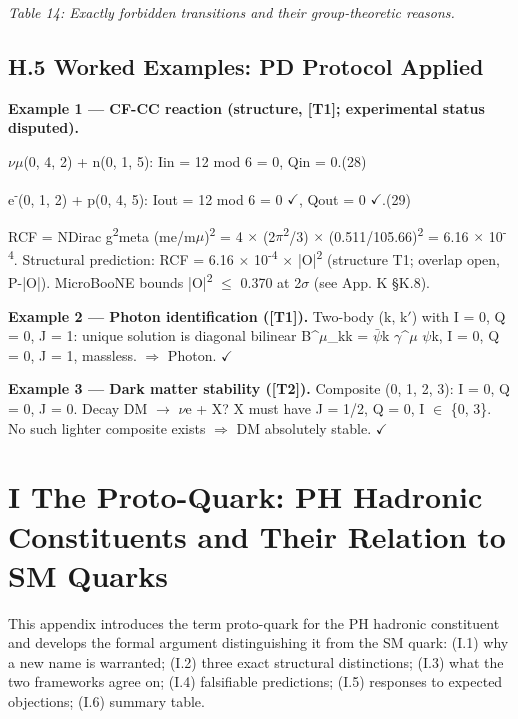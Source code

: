 \documentclass[11pt,letterpaper]{article}
\begin{document}
\begingroup\centering\footnotesize\itshape Table 14: Exactly forbidden transitions and their group-theoretic reasons.\par\endgroup

\subsection*{H.5  Worked Examples: PD Protocol Applied}

\noindent \textbf{Example 1 --- CF-CC reaction (structure, [T1]; experimental status disputed).}

\begingroup\centering $\nu$$\mu$(0, 4, 2) + n(0, 1, 5):  Iin = 12 mod 6 = 0,  Qin = 0.\hspace{2em}(28)\par\endgroup

\begingroup\centering e\textsuperscript{-}(0, 1, 2) + p(0, 4, 5):  Iout = 12 mod 6 = 0 $\checkmark$,  Qout = 0 $\checkmark$.\hspace{2em}(29)\par\endgroup

\noindent RCF = NDirac g\textsuperscript{2}meta (me/m$\mu$)\textsuperscript{2} = 4 $\times$ (2$\pi$\textsuperscript{2}/3) $\times$ (0.511/105.66)\textsuperscript{2} = 6.16 $\times$ 10\textsuperscript{-4}. Structural prediction: RCF = 6.16 $\times$ 10\textsuperscript{-4} $\times$ |O|\textsuperscript{2} (structure T1; overlap open, P-|O|). MicroBooNE bounds |O|\textsuperscript{2} $\le$ 0.370 at 2$\sigma$ (see App. K §K.8).

\noindent \textbf{Example 2 --- Photon identification ([T1]). }Two-body (k, k$'$) with I = 0, Q = 0, J = 1: unique solution is diagonal bilinear B\textasciicircum{}$\mu$\_kk = $\bar{\psi}$k $\gamma$\textasciicircum{}$\mu$ $\psi$k, I = 0, Q = 0, J = 1, massless. $\Rightarrow$ Photon. $\checkmark$

\noindent \textbf{Example 3 --- Dark matter stability ([T2]). }Composite (0, 1, 2, 3): I = 0, Q = 0, J = 0. Decay DM $\to$ $\nu$e + X? X must have J = 1/2, Q = 0, I $\in$ \{0, 3\}. No such lighter composite exists $\Rightarrow$ DM absolutely stable. $\checkmark$

\section*{I  The Proto-Quark: PH Hadronic Constituents and Their Relation to SM Quarks}

\noindent This appendix introduces the term proto-quark for the PH hadronic constituent and develops the formal argument distinguishing it from the SM quark: (I.1) why a new name is warranted; (I.2) three exact structural distinctions; (I.3) what the two frameworks agree on; (I.4) falsifiable predictions; (I.5) responses to expected objections; (I.6) summary table.
\end{document}
